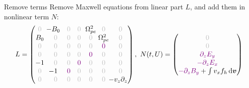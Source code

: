 \documentclass{beamer}
\newcommand{\Mvb}[1]{\boldsymbol{#1}}
\begin{document}
\begin{frame}{Remove terms}
  Remove Maxwell equations from linear part $L$, and add them in nonlinear term $N$:
  $$
    L = \begin{pmatrix}
      \gz & \hspace{-0.25cm}-B_0 & \gz                   & \gz                   & \hspace{-0.125cm}\Omega_{pe}^2\hspace{-0.125cm} &                  \gz                            & \gz \\ 
      B_0 &                  \gz & \gz                   & \gz                   &                  \gz                            & \hspace{-0.125cm}\Omega_{pe}^2\hspace{-0.125cm} & \gz \\
      \gz &                  \gz & \gz                   & \gz                   &                  \gz                            &                  \textcolor{violet}{0}          & \gz \\ 
      \gz &                  \gz & \gz                   & \gz                   &                  \textcolor{violet}{0}          &                  \gz                            & \gz \\ 
      -1  &                  \gz & \gz                   & \textcolor{violet}{0} &                  \gz                            &                  \gz                            & \gz \\ 
      \gz & \hspace{-0.25cm}-1   & \textcolor{violet}{0} & \gz                   &                  \gz                            &                  \gz                            & \gz \\ 
      \gz &                  \gz & \gz                   & \gz                   &                  \gz                            &                  \gz                            & \hspace{-0.25cm}-v_z\partial_z \\ 
    \end{pmatrix}
    ,\ 
    N(t,U) = \begin{pmatrix}
      \gz \\
      \gz \\
      \textcolor{violet}{ \partial_zE_y} \\
      \textcolor{violet}{-\partial_zE_x} \\
      \textcolor{violet}{-\partial_zB_y} + \int v_xf_h\dd{\Mvb{v}} \\

\end{pmatrix}$$
\end{frame}
\end{document}
